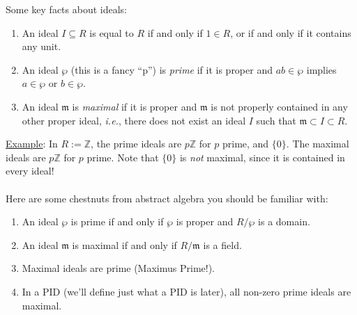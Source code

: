 \documentclass[12pt]{article}
\newcommand{\z}{\mathbb{Z}}
\newcommand{\ita}[1]{\textit{#1}}
\theoremstyle{definition}
\begin{document}
Some key facts about ideals:
\begin{enumerate}
    \item An ideal $I\subseteq R$ is equal to $R$ if and only if $1\in R$, or if and only if it contains any unit.
    \item An ideal $\wp$ (this is a fancy ``p'') is \ita{prime} if it is proper and $ab\in\wp$ implies $a\in\wp$ or $b\in\wp$. 
    \item An ideal $\mathfrak{m}$ is \ita{maximal} if it is proper and $\mathfrak{m}$ is not properly contained in any other proper ideal, \ita{i.e.}, there does not exist an ideal $I$ such that $\mathfrak{m}\subset I\subset R$.
\end{enumerate}
\underline{Example}: In $R:=\z$, the prime ideals are $p\z$ for $p$ prime, and $\{0\}$. The maximal ideals are $p\z$ for $p$ prime. Note that $\{0\}$ is \ita{not} maximal, since it is contained in every ideal!\\\\
Here are some chestnuts from abstract algebra you should be familiar with:
\begin{enumerate}
    \item An ideal $\wp$ is prime if and only if $\wp$ is proper and $R/\wp$ is a domain.
    \item An ideal $\mathfrak{m}$ is maximal if and only if $R/\mathfrak{m}$ is a field.
    \item Maximal ideals are prime (Maximus Prime!).
    \item In a PID (we'll define just what a PID is later), all non-zero prime ideals are maximal.
\end{enumerate}
\end{document}
